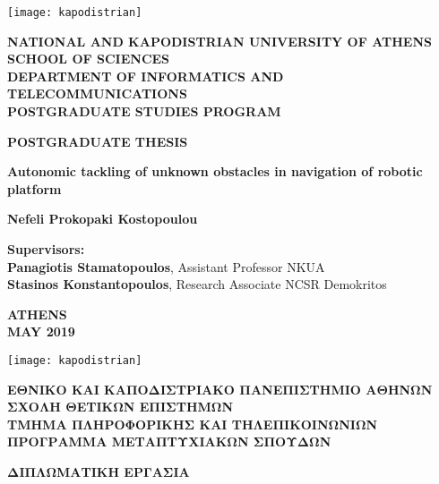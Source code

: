 \begin{center}
	\thispagestyle{empty}
	\texttt{[image: kapodistrian]}

	\large
	\textbf{NATIONAL AND KAPODISTRIAN UNIVERSITY OF ATHENS}\\
	\vspace{0.2cm}
	\normalsize
	\textbf{SCHOOL OF SCIENCES}\\
	\vspace{0.2cm}
	\textbf{DEPARTMENT OF INFORMATICS AND TELECOMMUNICATIONS}\\
	\vspace{0.2cm}
	\textbf{POSTGRADUATE STUDIES PROGRAM}
	
	\vspace{1.5cm}
	\textbf{POSTGRADUATE THESIS}
	
	\vspace{1.5cm}
	\Large
	\textbf{Autonomic tackling of unknown obstacles in navigation of robotic platform}
	
	\vspace{1.5cm}
	\normalsize
	\textbf{Nefeli Prokopaki Kostopoulou}
	
	\vspace{1.5cm}
	\textbf{Supervisors:}\\
	\textbf{Panagiotis Stamatopoulos}, Assistant Professor NKUA\\
	\textbf{Stasinos Konstantopoulos}, Research Associate NCSR Demokritos
	
	\vfill
	
	\vspace{0.8cm}
	\textbf{ATHENS}\\
	\vspace{0.2cm}
	\textbf{MAY 2019}
	\newpage
	
	
	\thispagestyle{empty}
	\texttt{[image: kapodistrian]}
	
	\large
	\textbf{ΕΘΝΙΚΟ ΚΑΙ ΚΑΠΟΔΙΣΤΡΙΑΚΟ ΠΑΝΕΠΙΣΤΗΜΙΟ ΑΘΗΝΩΝ}\\
	\vspace{0.2cm}
	\normalsize
	\textbf{ΣΧΟΛΗ ΘΕΤΙΚΩΝ ΕΠΙΣΤΗΜΩΝ}\\
	\vspace{0.2cm}
	\textbf{ΤΜΗΜΑ ΠΛΗΡΟΦΟΡΙΚΗΣ ΚΑΙ ΤΗΛΕΠΙΚΟΙΝΩΝΙΩΝ}\\
	\vspace{0.2cm}
	\textbf{ΠΡΟΓΡΑΜΜΑ ΜΕΤΑΠΤΥΧΙΑΚΩΝ ΣΠΟΥΔΩΝ}
	
	\vspace{1.5cm}
	\textbf{ΔΙΠΛΩΜΑΤΙΚΗ ΕΡΓΑΣΙΑ}
	

\end{center}
